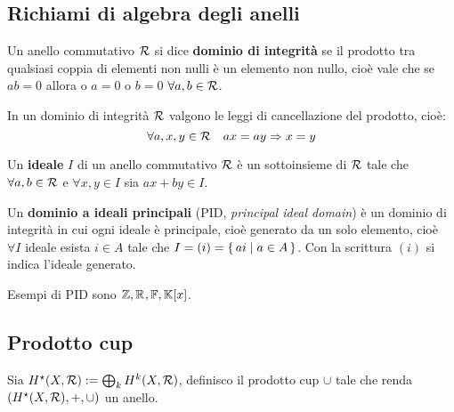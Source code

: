 \subsection{Richiami di algebra degli anelli}

\begin{definition}
  Un anello commutativo $ \mathcal{R} $ si dice \textbf{dominio di integrità}
  se il prodotto tra qualsiasi coppia di elementi non nulli è un elemento non nullo, cioè
  vale che se $ ab = 0 $ allora o $ a = 0 $ o $ b = 0 $ $ \forall a, b \in \mathcal{R} $.
\end{definition}

\begin{proposition}
  In un dominio di integrità $ \mathcal{R} $ valgono le leggi di cancellazione del prodotto, cioè:
  \[
    \forall a,x,y \in \mathcal{R} \quad ax = ay \Rightarrow x = y
  \]
\end{proposition}

\begin{definition}
  Un \textbf{ideale} $ I $ di un anello commutativo $ \mathcal{R} $ è un
  sottoinsieme di $ \mathcal{R} $ tale che $ \forall a,b \in \mathcal{R} $ e $ \forall x,y \in I $ sia
  $ a x + b y \in I $.
\end{definition}

\begin{definition}
  Un \textbf{dominio a ideali principali}
  (PID, \emph{principal ideal domain}) è un dominio di integrità in cui ogni
  ideale è principale, cioè generato da un solo
  elemento, cioè $ \forall I $ ideale esista $ i \in A $ tale che
  $ I = (i) = \set{a i | a \in A} $. Con la scrittura $ (i) $ si indica l'ideale
  generato.
\end{definition}

\begin{example}
  Esempi di PID sono $ \mathbb{Z}, \mathbb{R}^{}, \mathbb{F}, \mathbb{K}[x] $.
\end{example}

\subsection{Prodotto cup}

Sia $ H^\star (X,\mathcal{R}) := \bigoplus_k H^k(X,\mathcal{R}) $, definisco il prodotto
cup $ \cup $ tale che renda $ (H^\star (X,\mathcal{R}), +, \cup) $ un anello.

